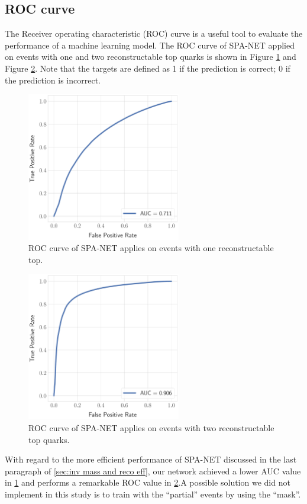 \subsection{ROC curve}\label{sebsec:roc}
The Receiver operating characteristic (ROC) curve is a useful tool to evaluate the performance of a machine learning model. The ROC curve of SPA-NET applied on events with one and two reconstructable top quarks is shown in Figure \ref{fig: roc one top} and Figure \ref{fig: roc two top}. Note that the targets are defined as 1 if the prediction is correct; 0 if the prediction is incorrect.
\\
 \begin{figure}[H]
 	\centering
 	\includegraphics[width=0.6\textwidth]{Figures/roc_one_quark.pdf}
 	\caption{ ROC curve of SPA-NET applies on events with one reconstructable top.}
 	\label{fig: roc one top}
 \end{figure}
 \begin{figure}[H]
 	\centering
 	\includegraphics[width=0.6\textwidth]{Figures/roc_two_quark.pdf}
 	\caption{ ROC curve of SPA-NET applies on events with two reconstructable top quarks.}
 	\label{fig: roc two top}
 \end{figure}
\newpage
With regard to the more efficient performance of SPA-NET discussed in the last paragraph of \ref{sec:inv mass and reco eff}, our network achieved a lower AUC value in \ref{fig: roc one top} and performs a remarkable ROC value in \ref{fig: roc two top}.A possible solution we did not implement in this study is to train with the ``partial'' events by using the ``mask''.\cite{Fenton:2020woz}\cite{Shmakov:2021qdz}
